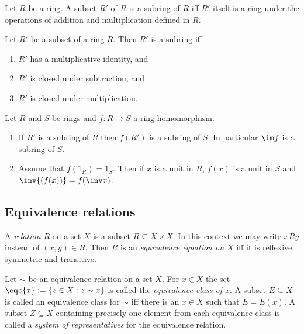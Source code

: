 \documentclass{article}
\begin{document}
\begin{definition}
	Let $R$ be a ring. A subset $R'$ of $R$ is a subring of $R$ iff $R'$ itself
	is a ring under the operations of addition and multiplication defined in $R$.
\end{definition}

\begin{proposition}[Notes 3.4.26]
	Let $R'$ be a subset of a ring $R$. Then $R'$ is a subring iff
	\begin{enumerate}
		\item $R'$ has a multiplicative identity, and
		\item $R'$ is closed under subtraction, and
		\item $R'$ is closed under multiplication.
	\end{enumerate}
\end{proposition}

\begin{proposition}[Notes 3.4.28]
	Let $R$ and $S$ be rings and $f:R\to S$ a ring homomorphism.
	\begin{enumerate}
		\item If $R'$ is a subring of $R$ then $f(R')$ is a subring of $S$. In particular
		      $\im f$ is a subring of $S$.
		\item Assume that $f(1_R)=1_S$. Then if $x$ is a unit in $R$, $f(x)$ is a unit
		      in $S$ and $\inv{(f(x))} = f(\inv x)$.
	\end{enumerate}
\end{proposition}

\subsection{Equivalence relations}

\begin{definition}
	A \emph{relation $R$} on a set $X$ is a subset $R\subseteq X\times X$. In this context we
	may write $xRy$ instead of $(x,y)\in R$. Then $R$ is an \emph{equivalence equation on $X$}
	iff it is reflexive, symmetric and transitive.
\end{definition}
\begin{definition}
	Let $\sim$ be an equivalence relation on a set $X$. For $x\in X$ the set $\eqc{x}:=\{z\in X:z\sim x\}$
	is called the \emph{equivalence class of $x$}. A subset $E\subseteq X$ is called an equivalence
	class for $\sim$ iff there is an $x\in X$ such that $E=E(x)$. A subset $Z\subseteq X$ containing
	precisely one element from each equivalence class is called a \emph{system of representatives}
	for the equivalence relation.
\end{definition}
\end{document}
